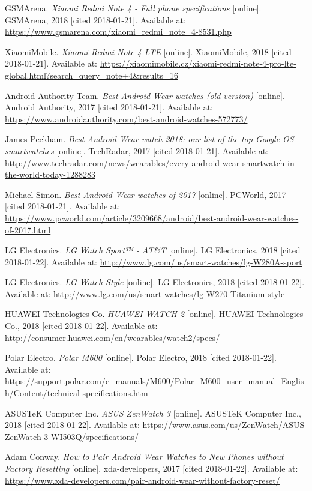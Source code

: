 \begin{thebibliography}{10}
GSMArena. \textit{Xiaomi Redmi Note 4 - Full phone specifications} [online]. GSMArena, 2018 [cited 2018-01-21]. Available at: \url{https://www.gsmarena.com/xiaomi_redmi_note_4-8531.php}

XiaomiMobile. \textit{Xiaomi Redmi Note 4 LTE} [online]. XiaomiMobile, 2018 [cited 2018-01-21]. Available at: \url{https://xiaomimobile.cz/xiaomi-redmi-note-4-pro-lte-global.html?search_query=note+4&results=16}

Android Authority Team. \textit{Best Android Wear watches (old version)} [online]. Android Authority, 2017 [cited 2018-01-21]. Available at: \url{https://www.androidauthority.com/best-android-watches-572773/}

James Peckham. \textit{Best Android Wear watch 2018: our list of the top Google OS smartwatches} [online]. TechRadar, 2017 [cited 2018-01-21]. Available at: \url{http://www.techradar.com/news/wearables/every-android-wear-smartwatch-in-the-world-today-1288283}

Michael Simon. \textit{Best Android Wear watches of 2017} [online]. PCWorld, 2017 [cited 2018-01-21]. Available at: \url{https://www.pcworld.com/article/3209668/android/best-android-wear-watches-of-2017.html}

LG Electronics. \textit{LG Watch Sport™ - AT\&T} [online]. LG Electronics, 2018 [cited 2018-01-22]. Available at: \url{http://www.lg.com/us/smart-watches/lg-W280A-sport}

LG Electronics. \textit{LG Watch Style} [online]. LG Electronics, 2018 [cited 2018-01-22]. Available at: \url{http://www.lg.com/us/smart-watches/lg-W270-Titanium-style}

HUAWEI Technologies Co. \textit{HUAWEI WATCH 2} [online]. HUAWEI Technologies Co., 2018 [cited 2018-01-22]. Available at: \url{http://consumer.huawei.com/en/wearables/watch2/specs/}

Polar Electro. \textit{Polar M600} [online]. Polar Electro, 2018 [cited 2018-01-22]. Available at: \url{https://support.polar.com/e_manuals/M600/Polar_M600_user_manual_English/Content/technical-specifications.htm}

ASUSTeK Computer Inc. \textit{ASUS ZenWatch 3} [online]. ASUSTeK Computer Inc., 2018 [cited 2018-01-22]. Available at: \url{https://www.asus.com/us/ZenWatch/ASUS-ZenWatch-3-WI503Q/specifications/}

Adam Conway. \textit{How to Pair Android Wear Watches to New Phones without Factory Resetting} [online]. xda-developers, 2017 [cited 2018-01-22]. Available at: \url{https://www.xda-developers.com/pair-android-wear-without-factory-reset/}


\end{thebibliography}
